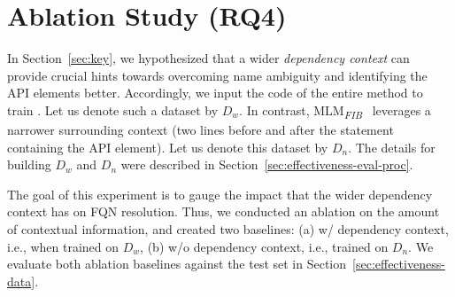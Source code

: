\section{Ablation Study (RQ4)}
\label{sec:ablation}

In Section~\ref{sec:key}, we hypothesized that a wider {\em dependency
  context} can provide crucial hints towards overcoming name ambiguity
and identifying the API elements better. Accordingly, we input the
code of the entire method to train {\tool}. Let us denote such a
dataset by $D_w$. In contrast,
MLM\textsubscript{\textit{FIB}}~\cite{prompt-ase22} leverages a
narrower surrounding context (two lines before and after the statement
containing the API element). Let us denote this dataset by $D_n$. The
details for building $D_w$ and $D_n$ were described in
Section~\ref{sec:effectiveness-eval-proc}.

The goal of this experiment is to gauge the impact that the wider
dependency context has on FQN resolution. Thus, we conducted an
ablation on the amount of contextual information, and created two
baselines: (a) \tool w/ dependency context, i.e., when trained on
$D_w$, (b) \tool w/o dependency context, i.e., trained on $D_n$. We
evaluate both ablation baselines against the test set in
Section~\ref{sec:effectiveness-data}.


